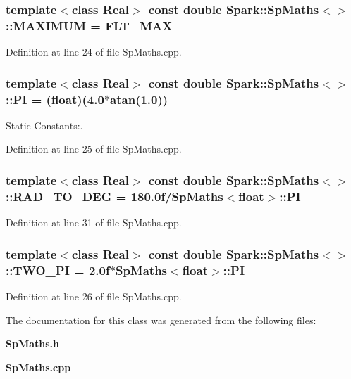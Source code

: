\subsubsection{\setlength{\rightskip}{0pt plus 5cm}template$<$class Real$>$ const double {\bf Spark::Sp\-Maths}$<$$>$::{\bf MAXIMUM} = FLT\_\-MAX\hspace{0.3cm}{\tt  [static]}}\label{classSpark_1_1SpMaths_s8}


Definition at line 24 of file Sp\-Maths.cpp.
\subsubsection{\setlength{\rightskip}{0pt plus 5cm}template$<$class Real$>$ const double {\bf Spark::Sp\-Maths}$<$$>$::{\bf PI} = (float)(4.0$\ast$atan(1.0))\hspace{0.3cm}{\tt  [static]}}\label{classSpark_1_1SpMaths_s0}


Static Constants:. 

Definition at line 25 of file Sp\-Maths.cpp.
\subsubsection{\setlength{\rightskip}{0pt plus 5cm}template$<$class Real$>$ const double {\bf Spark::Sp\-Maths}$<$$>$::{\bf RAD\_\-TO\_\-DEG} = 180.0f/{\bf Sp\-Maths}$<$float$>$::{\bf PI}\hspace{0.3cm}{\tt  [static]}}\label{classSpark_1_1SpMaths_s6}


Definition at line 31 of file Sp\-Maths.cpp.
\subsubsection{\setlength{\rightskip}{0pt plus 5cm}template$<$class Real$>$ const double {\bf Spark::Sp\-Maths}$<$$>$::{\bf TWO\_\-PI} = 2.0f$\ast${\bf Sp\-Maths}$<$float$>$::{\bf PI}\hspace{0.3cm}{\tt  [static]}}\label{classSpark_1_1SpMaths_s1}


Definition at line 26 of file Sp\-Maths.cpp.

The documentation for this class was generated from the following files:\begin{CompactItemize}
\item 
{\bf Sp\-Maths.h}\item 
{\bf Sp\-Maths.cpp}\end{CompactItemize}
